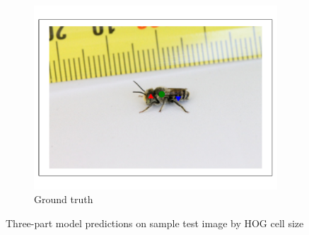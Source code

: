 \documentclass[11pt, oneside]{report}
\begin{document}
\begin{figure}[p]
\begin{subfigure}[b]{0.3\textwidth}
                \includegraphics[width=\textwidth]{hog_gt3.pdf}
                \caption{Ground truth}
            \end{subfigure}

            \hspace{0pt}

            \begin{subfigure}[b]{0.2\textwidth}
                \centering
            \end{subfigure}
            \caption{Three-part model predictions on sample test image by HOG cell size}
            \label{fig:hog_vis1}
        \end{figure}
\end{document}
